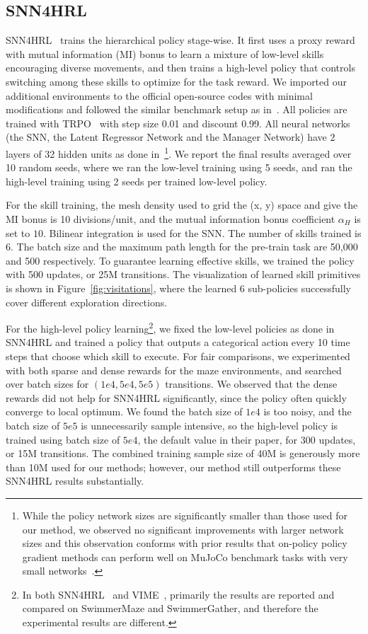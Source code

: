 \documentclass{article}
\begin{document}
\subsection{SNN4HRL}
SNN4HRL~\cite{florensa2017stochastic} trains the hierarchical policy stage-wise. It first uses a proxy reward with mutual information (MI) bonus to learn a mixture of low-level skills encouraging diverse movements, and then trains a high-level policy that controls switching among these skills to optimize for the task reward. We imported our additional environments to the official open-source codes with minimal modifications and followed the similar benchmark setup as in~\cite{florensa2017stochastic}. All policies are trained with TRPO~\cite{schulman2015trust} with step size 0.01 and discount 0.99. All neural networks (the SNN, the Latent Regressor Network and the Manager Network) have 2 layers of 32 hidden units as done in~\cite{florensa2017stochastic}\footnote{While the policy network sizes are significantly smaller than those used for our method, we observed no significant improvements with larger network sizes and this observation conforms with prior results that on-policy policy gradient methods can perform well on MuJoCo benchmark tasks with very small networks~\cite{duan2016benchmarking,rajeswaran2017towards}.}. We report the final results averaged over 10 random seeds, where we ran the low-level training using 5 seeds, and ran the high-level training using 2 seeds per trained low-level policy.

For the skill training, the mesh density used to grid the (x, y) space and give the MI bonus is 10 divisions/unit, and the mutual information bonus coefficient $\alpha_H$ is set to $10$. Bilinear integration is used for the SNN. The number of skills trained is 6. The batch size and the maximum path length for the pre-train task are 50,000 and 500 respectively. To guarantee learning effective skills, we trained the policy with 500 updates, or 25M transitions. The visualization of learned skill primitives is shown in Figure~\ref{fig:visitations}, where the learned 6 sub-policies successfully cover different exploration directions. 

For the high-level policy learning\footnote{In both SNN4HRL~\cite{florensa2017stochastic} and VIME~\cite{houthooft2016vime}, primarily the results are reported and compared on SwimmerMaze and SwimmerGather, and therefore the experimental results are different.}, we fixed the low-level policies as done in SNN4HRL and trained a policy that outputs a categorical action every 10 time steps that choose which skill to execute. For fair comparisons, we experimented with both sparse and dense rewards for the maze environments, and searched over batch sizes for $(1e4,5e4,5e5)$ transitions. We observed that the dense rewards did not help for SNN4HRL significantly, since the policy often quickly converge to local optimum. We found the batch size of $1e4$ is too noisy, and the batch size of $5e5$ is unnecessarily sample intensive, so the high-level policy is trained using batch size of $5e4$, the default value in their paper, for 300 updates, or 15M transitions. The combined training sample size of 40M is generously more than 10M used for our methods; however, our method still outperforms these SNN4HRL results substantially. 
\end{document}
